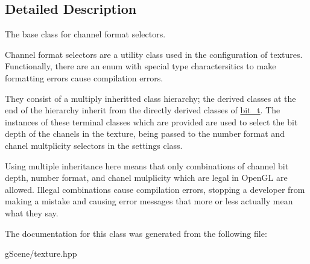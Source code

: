 \subsection{Detailed Description}
The base class for channel format selectors. 

Channel format selectors are a utility class used in the configuration of textures. Functionally, there are an enum with special type charactersitics to make formatting errors cause compilation errors.

They consist of a multiply inheritted class hierarchy; the derived classes at the end of the hierarchy inherit from the directly derived classes of \hyperlink{classgfx_1_1bit__t}{bit\-\_\-t}. The instances of these terminal classes which are provided are used to select the bit depth of the chanels in the texture, being passed to the number format and chanel multplicity selectors in the settings class.

Using multiple inheritance here means that only combinations of channel bit depth, number format, and chanel mulplicity which are legal in Open\-G\-L are allowed. Illegal combinations cause compilation errors, stopping a developer from making a mistake and causing error messages that more or less actually mean what they say. 

The documentation for this class was generated from the following file\-:\begin{DoxyCompactItemize}
\item 
g\-Scene/texture.\-hpp\end{DoxyCompactItemize}

